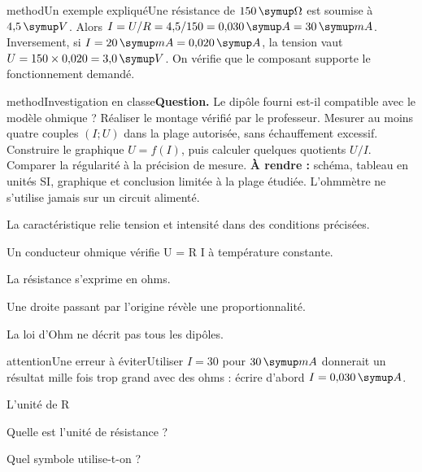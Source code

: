 \begin{pcEncadre}{method}{Un exemple expliqué}Une résistance de $150\unite\Omega$ est soumise à $4{,}5\unite V$. Alors $I=U/R=4{,}5/150=0{,}030\unite A=30\unite{mA}$. Inversement, si $I=20\unite{mA}=0{,}020\unite A$, la tension vaut $U=150\times0{,}020=3{,}0\unite V$. On vérifie que le composant supporte le fonctionnement demandé.\end{pcEncadre}
\label{activite-16}
\begin{pcEncadre}{method}{Investigation en classe}\textbf{Question.} Le dipôle fourni est-il compatible avec le modèle ohmique ? Réaliser le montage vérifié par le professeur. Mesurer au moins quatre couples $(I;U)$ dans la plage autorisée, sans échauffement excessif. Construire le graphique $U=f(I)$, puis calculer quelques quotients $U/I$. Comparer la régularité à la précision de mesure. \textbf{À rendre :} schéma, tableau en unités SI, graphique et conclusion limitée à la plage étudiée. L’ohmmètre ne s’utilise jamais sur un circuit alimenté.\end{pcEncadre}
\begin{questions}
\item La caractéristique relie tension et intensité dans des conditions précisées.
\item Un conducteur ohmique vérifie U = R I à température constante.
\item La résistance s’exprime en ohms.
\item Une droite passant par l’origine révèle une proportionnalité.
\item La loi d’Ohm ne décrit pas tous les dipôles.
\end{questions}
\begin{pcEncadre}{attention}{Une erreur à éviter}Utiliser $I=30$ pour $30\unite{mA}$ donnerait un résultat mille fois trop grand avec des ohms : écrire d’abord $I=0{,}030\unite A$.\end{pcEncadre}
\pcGrille
\clearpage{}
\par\noindent\begin{minipage}{\linewidth}
\begin{exercice}[1]{L’unité de R}
\begin{questions}
\item Quelle est l’unité de résistance ?
\item Quel symbole utilise-t-on ?
\end{questions}
\end{exercice}
\end{minipage}

